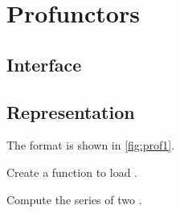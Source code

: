 \section{Profunctors}


\label{sec:exercises-profunctors}

\subsection*{Interface}


\subsection*{Representation}

The format is shown in \cref{fig:prof1}.


\begin{codeexercise}
    Create a function to load .


\end{codeexercise}

\begin{codeexercise}
    Compute the series of two .
\end{codeexercise}
